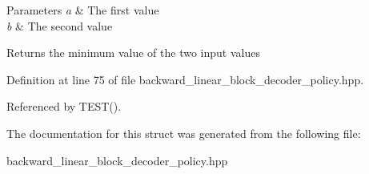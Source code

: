 \begin{DoxyParams}{Parameters}
{\em a} & The first value \\
\hline
{\em b} & The second value \\
\hline
\end{DoxyParams}
\begin{DoxyReturn}{Returns}
the minimum value of the two input values 
\end{DoxyReturn}


Definition at line 75 of file backward\-\_\-linear\-\_\-block\-\_\-decoder\-\_\-policy.\-hpp.



Referenced by T\-E\-S\-T().



The documentation for this struct was generated from the following file\-:\begin{DoxyCompactItemize}
\item 
backward\-\_\-linear\-\_\-block\-\_\-decoder\-\_\-policy.\-hpp\end{DoxyCompactItemize}
